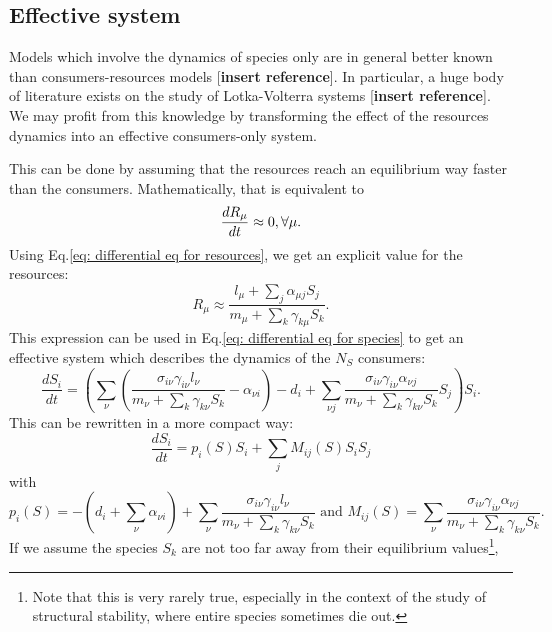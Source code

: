 \documentclass[12pt]{report}
\begin{document}
\subsection{Effective system}
Models which involve the dynamics of species only are in general better known than consumers-resources models [\textbf{insert reference}]. In particular, a huge body of literature exists on the study of Lotka-Volterra systems [\textbf{insert reference}]. We may profit from this knowledge by transforming the effect of the resources dynamics into an effective consumers-only system.

This can be done by assuming that the resources reach an equilibrium way faster than the consumers.
Mathematically, that is equivalent to
\begin{equation}
  \frac{dR_\mu}{dt} \approx 0, \\ \forall \mu.
\end{equation}
Using Eq.\eqref{eq: differential eq for resources}, we get an explicit value for the resources:
\begin{equation}
  R_\mu \approx \frac{l_\mu+\sum_j \alpha_{\mu j}S_j}{m_\mu + \sum_k \gamma_{k\mu}S_k}.
\end{equation}
This expression can be used in Eq.\eqref{eq: differential eq for species} to get an effective system which describes the dynamics of the $N_S$ consumers:
\begin{equation}
  \frac{dS_i}{dt} = \left(\sum_\nu \left(\frac{\sigma_{i\nu}\gamma_{i\nu}l_\nu}{m_\nu+\sum_k \gamma_{k\nu}S_k} - \alpha_{\nu i}\right) -d_i + \sum_{\nu j} \frac{\sigma_{i\nu}\gamma_{i\nu}\alpha_{\nu j}}{m_\nu+\sum_{k}\gamma_{k\nu}S_k}S_j \right) S_i.
\end{equation}
This can be rewritten in a more compact way:
\begin{equation}
  \frac{dS_i}{dt} = p_i(S) S_i + \sum_j M_{ij}(S)S_i S_j \label{eq: effective equations of evolution}
\end{equation}
with
\begin{equation}
    p_i(S) = -\left(d_i+\sum_{\nu}\alpha_{\nu i}\right) + \sum_\nu \frac{\sigma_{i\nu}\gamma_{i\nu}l_\nu}{m_\nu+\sum_k \gamma_{k\nu}S_k}\text{ and } M_{ij}(S)=\sum_{\nu}\frac{\sigma_{i\nu}\gamma_{i\nu}\alpha_{\nu j}}{m_\nu+\sum_{k}\gamma_{k\nu}S_k}.
\end{equation}
If we assume the species $S_k$ are not too far away from their equilibrium values\footnote{Note that this is very rarely true, especially in the context of the study of structural stability, where entire species sometimes die out.}, \ie
\end{document}
